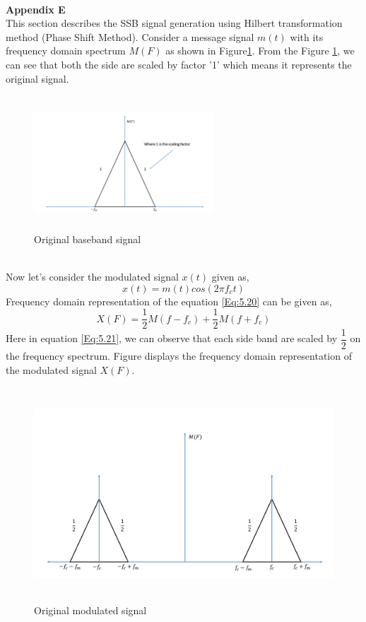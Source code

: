 \\
\textbf{Appendix E}\\
This section describes the SSB signal generation using Hilbert transformation method (Phase Shift Method). Consider a message signal $m(t)$ with its frequency domain spectrum $M(F)$ as shown in Figure\ref{Original_baseband_signal}. From the Figure \ref{Original_baseband_signal}, we can see that both the side are scaled by factor '1' which means it represents the original signal.
\begin{figure}[h]
	\centering
	\includegraphics[width=0.6\textwidth, height=5cm]{./sdf/simplified_coherent_receiver/figures/SSB1.pdf}
	\caption{Original baseband signal}\label{Original_baseband_signal}
\end{figure}\\ 	
Now let's consider the modulated signal $x(t)$ given as,
\begin{equation}
x(t)=m(t) cos(2\pi f_c t)
\label{Eq:5.20}
\end{equation}
Frequency domain representation of the equation \ref{Eq:5.20} can be given as,
\begin{equation}
X(F)=\frac{1}{2}M(f-f_c)+\frac{1}{2}M(f+f_c)
\label{Eq:5.21}
\end{equation}
Here in equation \ref{Eq:5.21}, we can observe that each side band are scaled by $\dfrac{1}{2}$ on the frequency spectrum. Figure displays the frequency domain representation of the modulated signal $X(F)$.
\begin{figure}[h]
	\centering
	\includegraphics[width=1.0\textwidth, height=8cm]{./sdf/simplified_coherent_receiver/figures/SSB2.pdf}
	\caption{Original modulated signal}\label{Original_modulated_signal}
\end{figure}\\ 
